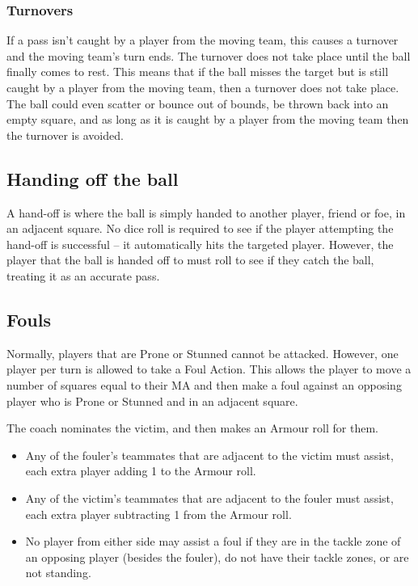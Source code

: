 \documentclass{article}
\begin{document}
\begin{multicols}{2}
\subsubsection{Turnovers}
\par If a pass isn't caught by a player from the moving team, this causes a turnover and the moving team's turn ends. The turnover does not take place until the ball finally comes to rest. This means that if the ball misses the target but is still caught by a player from the moving team, then a turnover does not take place. The ball could even scatter or bounce out of bounds, be thrown back into an empty square, and as long as it is caught by a player from the moving team then the turnover is avoided.

\subsection{Handing off the ball}
\par A hand-off is where the ball is simply handed to another player, friend or foe, in an adjacent square. No dice roll is required to see if the player attempting the hand-off is successful -- it automatically hits the targeted player. However, the player that the ball is handed off to must roll to see if they catch the ball, treating it as an accurate pass.

\subsection{Fouls}
\par Normally, players that are Prone or Stunned cannot be attacked. However, one player per turn is allowed to take a Foul Action. This allows the player to move a number of squares equal to their MA and then make a foul against an opposing player who is Prone or Stunned and in an adjacent square.
\par The coach nominates the victim, and then makes an Armour roll for them.

\begin{itemize}
\item Any of the fouler's teammates that are adjacent to the victim must assist, each extra player adding 1 to the Armour roll.
\item Any of the victim's teammates that are adjacent to the fouler must assist, each extra player subtracting 1 from the Armour roll.
\item No player from either side may assist a foul if they are in the tackle zone of an opposing player (besides the fouler), do not have their tackle zones, or are not standing.
\end{itemize}


\end{multicols}
\end{document}
